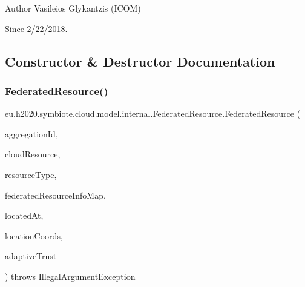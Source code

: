\begin{DoxyAuthor}{Author}
Vasileios Glykantzis (I\+C\+OM) 
\end{DoxyAuthor}
\begin{DoxySince}{Since}
2/22/2018. 
\end{DoxySince}


\subsection{Constructor \& Destructor Documentation}
\mbox{\label{classeu_1_1h2020_1_1symbiote_1_1cloud_1_1model_1_1internal_1_1FederatedResource_ad0bbb31499624d05a59a268866eae067}} 
\subsubsection{\texorpdfstring{Federated\+Resource()}{FederatedResource()}}
{\footnotesize\ttfamily eu.\+h2020.\+symbiote.\+cloud.\+model.\+internal.\+Federated\+Resource.\+Federated\+Resource (\begin{DoxyParamCaption}\item[{@Json\+Property(\char`\"{}aggregation\+Id\char`\"{}) String}]{aggregation\+Id,  }\item[{@Json\+Property(\char`\"{}cloud\+Resource\char`\"{}) Cloud\+Resource}]{cloud\+Resource,  }\item[{@Json\+Property(\char`\"{}resource\+Type\char`\"{}) String}]{resource\+Type,  }\item[{@Json\+Property(\char`\"{}federated\+Resource\+Info\+Map\char`\"{}) Map$<$ String, \hyperlink{classeu_1_1h2020_1_1symbiote_1_1cloud_1_1model_1_1internal_1_1FederatedResourceInfo}{Federated\+Resource\+Info} $>$}]{federated\+Resource\+Info\+Map,  }\item[{@Json\+Property(\char`\"{}located\+At\char`\"{}) Location}]{located\+At,  }\item[{@Json\+Property(\char`\"{}location\+Coords\char`\"{}) double \mbox{[}$\,$\mbox{]}}]{location\+Coords,  }\item[{@Json\+Property(\char`\"{}adaptive\+Trust\char`\"{}) Double}]{adaptive\+Trust }\end{DoxyParamCaption}) throws Illegal\+Argument\+Exception}

